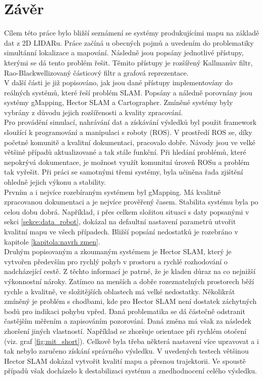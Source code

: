\documentclass[12pt]{report}
\begin{document}
\chapter{Závěr}
Cílem této práce bylo bližší seznámení se systémy produkujícími mapu na základě dat z 2D LIDARu. Práce začíná u obecných pojmů a uvedením do problematiky simultánní lokalizace a mapování. Následně jsou popsány jednotlivé přístupy, kterými se dá tento problém řešit. Těmito přístupy je rozšířený Kallmanův filtr, Rao-Blackwellizovaný částicový filtr a grafová reprezentace.\\
\indent V další části je již popisováno, jak jsou dané přístupy implementovány do reálných systémů, které řeší problém SLAM. Popsány a náledně porovnány jsou systémy gMapping, Hector SLAM a Cartographer. Zmíněné systémy byly vybrány z důvodu jejich rozšířenosti a kvality zpracování.\\
\indent Pro provádění simulací, nahrávání dat a získávání výsledků byl použit framework sloužící k programování a manipulaci s roboty (ROS). V prostředí ROS se, díky početné komunitě a kvalitní dokumentaci, pracovalo dobře. Návody jsou ve velké většině případů aktualizované a tak stále funkční. Při hledání problémů, které nepokrývá dokumentace, je možnost využít komunitní úroveň ROSu a problém tak vyřešit. Při práci se samotnými třemi systémy, byla učiněna řada zjištění ohledně jejich výkonu a stability. \\
\indent Prvním a i nejvíce rozebíraným systémem byl gMapping. Má kvalitně zpracovanou dokumentaci a je nejvíce prověřený časem. Stabilita systému byla po celou dobu dobrá. Například, i přes celkem složitou situaci s daty popsanými v sekci \ref{sekce:data_robot}, dokázal na defaultní nastavení parametrů utvořit kvalitní mapu ve všech případech. Bližší popsání nedostatků je rozebráno v kapitole \ref{kapitola:navrh zmen}.\\
\indent Druhým popisovaným a zkoumaným systémem je Hector SLAM, který je vytvořen především pro rychlý pohyb v prostoru a rychlé rozhodování o nadcházející cestě. Z těchto informací je patrné, že je kladen důraz na co nejnižší výkonnostní nároky. Zatímco na menších a dobře rozeznatelných prostorech běží rychle a kvalitně, ve složitějších oblastech má velké nedostatky. Několikrát zmíněný je problém s chodbami, kde pro Hector SLAM není dostatek záchytných bodů pro indikaci pohybu vpřed. Daná problematika se dá částečně odstranit častějším měřením a zapisováním pozorování. Daná změna má však za následek zhoršení jiných vlastností. Například se zhoršuje orientace při rychlém otočení (viz. graf \ref{fig:mit_short}). Celkově byla třeba některá nastavení více upravovat a i tak nebylo zaručeno získání správného výsledku. V uvedených testech většinou Hector SLAM dokázal vytvořit kvalití mapu a přesnou trajektorii. Ve spoustě případů však docházelo k destabilizaci systému a znedhodnocení celého výsledku.\\
\end{document}
